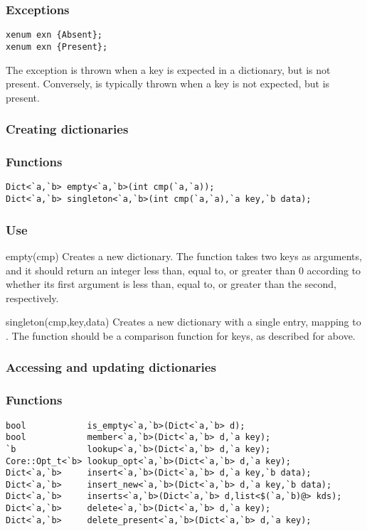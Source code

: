 \subsubsection*{Exceptions}
\begin{verbatim}
xenum exn {Absent};
xenum exn {Present};
\end{verbatim}

The exception  is thrown when a key is expected in a
dictionary, but is not present.  Conversely,  is
typically thrown when a key is not expected, but is present.


\subsubsection*{Creating dictionaries}

\subsubsection*{Functions}
\begin{verbatim}
Dict<`a,`b> empty<`a,`b>(int cmp(`a,`a));
Dict<`a,`b> singleton<`a,`b>(int cmp(`a,`a),`a key,`b data);
\end{verbatim}

\subsubsection*{Use}
\begin{defun}{empty}{(cmp)}
Creates a new dictionary.  The function  takes two keys as
arguments, and it should return an integer less than, equal to, or
greater than 0 according to whether its first argument is less than,
equal to, or greater than the second, respectively.
\end{defun}

\begin{defun}{singleton}{(cmp,key,data)}
Creates a new dictionary with a single entry, mapping  to
.  The function  should be a comparison function for
keys, as described for  above.
\end{defun}

\subsubsection*{Accessing and updating dictionaries}

\subsubsection*{Functions}
\begin{verbatim}
bool            is_empty<`a,`b>(Dict<`a,`b> d);
bool            member<`a,`b>(Dict<`a,`b> d,`a key);
`b              lookup<`a,`b>(Dict<`a,`b> d,`a key);
Core::Opt_t<`b> lookup_opt<`a,`b>(Dict<`a,`b> d,`a key);
Dict<`a,`b>     insert<`a,`b>(Dict<`a,`b> d,`a key,`b data);
Dict<`a,`b>     insert_new<`a,`b>(Dict<`a,`b> d,`a key,`b data);
Dict<`a,`b>     inserts<`a,`b>(Dict<`a,`b> d,list<$(`a,`b)@> kds);
Dict<`a,`b>     delete<`a,`b>(Dict<`a,`b> d,`a key);
Dict<`a,`b>     delete_present<`a,`b>(Dict<`a,`b> d,`a key);
\end{verbatim}

